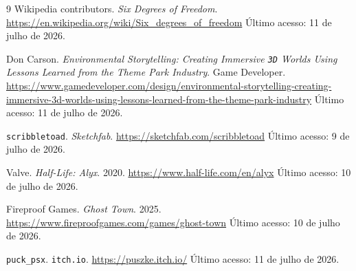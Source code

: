 \documentclass[a4paper, 12pt]{book}
\begin{document}
\begin{thebibliography}{9}
Wikipedia contributors.
\textit{Six Degrees of Freedom}.
\url{https://en.wikipedia.org/wiki/Six_degrees_of_freedom}
Último acesso: 11 de julho de 2026.

Don Carson.
\textit{Environmental Storytelling: Creating Immersive \texttt{3D} Worlds Using Lessons Learned from the Theme Park Industry}.
Game Developer.
\url{https://www.gamedeveloper.com/design/environmental-storytelling-creating-immersive-3d-worlds-using-lessons-learned-from-the-theme-park-industry}
Último acesso: 11 de julho de 2026.

\texttt{scribbletoad}.
\textit{Sketchfab}.
\url{https://sketchfab.com/scribbletoad}
Último acesso: 9 de julho de 2026.

Valve.
\textit{Half-Life: Alyx}.
2020.
\url{https://www.half-life.com/en/alyx}
Último acesso: 10 de julho de 2026.

Fireproof Games.
\textit{Ghost Town}.
2025.
\url{https://www.fireproofgames.com/games/ghost-town}
Último acesso: 10 de julho de 2026.

\texttt{puck\_psx}.
\texttt{itch.io}.
\url{https://puszke.itch.io/}
Último acesso: 11 de julho de 2026.

\end{thebibliography}
\end{document}
